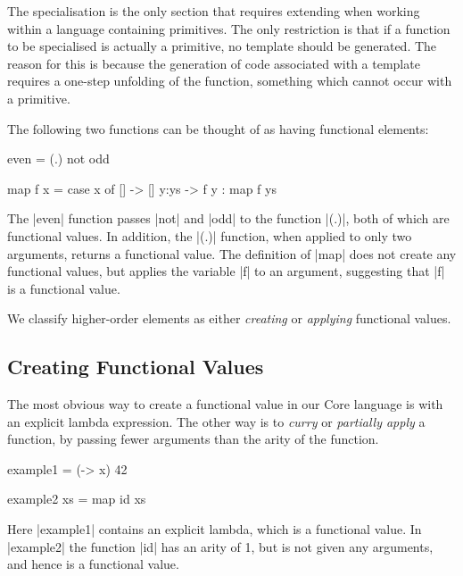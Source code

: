 \documentclass[preprint]{sigplanconf}
\begin{document}
The specialisation is the only section that requires extending when working within a language containing primitives. The only restriction is that if a function to be specialised is actually a primitive, no template should be generated. The reason for this is because the generation of code associated with a template requires a one-step unfolding of the function, something which cannot occur with a primitive.


\begin{example}
\label{ex:ho_elements}
The following two functions can be thought of as having functional elements:

\begin{code}
even = (.) not odd

map f x = case  x of
                []    -> []
                y:ys  -> f y : map f ys
\end{code}

The |even| function passes |not| and |odd| to the function |(.)|, both of which are functional values. In addition, the |(.)| function, when applied to only two arguments, returns a functional value. The definition of |map| does not create any functional values, but applies the variable |f| to an argument, suggesting that |f| is a functional value.
\end{example}

We classify higher-order elements as either \textit{creating} or \textit{applying} functional values.

\subsection{Creating Functional Values}

The most obvious way to create a functional value in our Core language is with an explicit lambda expression. The other way is to \textit{curry} or \textit{partially apply} a function, by passing fewer arguments than the arity of the function.

\begin{example}
\begin{code}
example1 = (\x -> x) 42

example2 xs = map id xs
\end{code}

Here |example1| contains an explicit lambda, which is a functional value. In |example2| the function |id| has an arity of 1, but is not given any arguments, and hence is a functional value.
\end{example}
\end{document}
